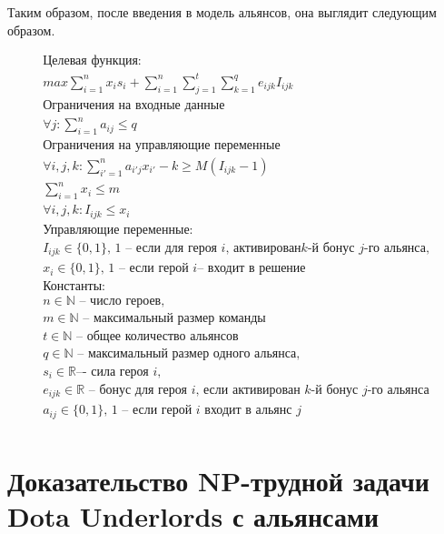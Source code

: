 \documentclass{article}
\begin{document}
Таким образом, после введения в модель альянсов, она выглядит следующим образом.

\begin{equation}
\label{DUIP}
\begin{gathered}
\textbf{Целевая функция:}\\
max \sum_{i=1}^{n} x_i s_i + \sum_{i=1}^{n} \sum_{j=1}^{t}  \sum_{k=1}^{q} e_{ijk} I_{ijk} \\
\textbf{Ограничения на входные данные}\\
\forall{j} : \sum_{i=1}^n a_{ij} \le q \\
\textbf{Ограничения на управляющие переменные} \\
\forall{i,j,k} :  \sum_{i'=1}^{n} a_{i'j} x_{i'} - k \ge M( I_{ijk}  - 1) \\
\sum_{i=1}^n x_i \le m   \\ 
\forall{i,j,k} :  I_{ijk}  \le x_i \\
\text{Управляющие переменные:} \\
I_{ijk} \in \{0, 1\} \text {, 1 – если для героя } i \text{, активирован} k\text{-й бонус } j \text{-го альянса,} \\
x_i  \in \{0, 1\} \text{, 1 -- если герой } i \text{– входит в решение} \\
\textbf{Константы:} \\
n \in \mathbb{N} \text{ -- число героев,} \\
m \in \mathbb{N} \text{ -- максимальный размер команды}\\
t \in \mathbb{N} \text{ -- общее количество альянсов} \\
q \in \mathbb{N} \text{ -- максимальный размер одного альянса,} \\
s_i  \in \mathbb{R} \text{–- сила героя } i, \\
e_{ijk} \in \mathbb{R} \text{ -- бонус для героя } i \text{,  если активирован } k
\text{-й бонус } j \text{-го альянса} \\
a_{ij} \in \{0, 1\} \text{, 1 -- если герой } i \text{ входит в альянс } j \\ 
\end{gathered}
\end{equation}

\section{Доказательство NP-трудной задачи Dota Underlords с альянсами}
\label{SectionNPCompleteProof}
\end{document}
